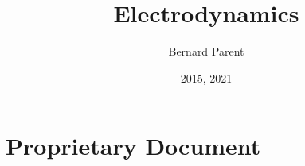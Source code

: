 \documentclass{warpdoc}
\author{
  Bernard Parent
}
\title{
  Electrodynamics
}
\date{
  2015, 2021
}
\begin{document}
  \pagestyle{headings}
  \setcounter{page}{1}
  \makewarpdoctitle
  \tableofcontents


\section{Proprietary Document}



  
  
\end{document}
